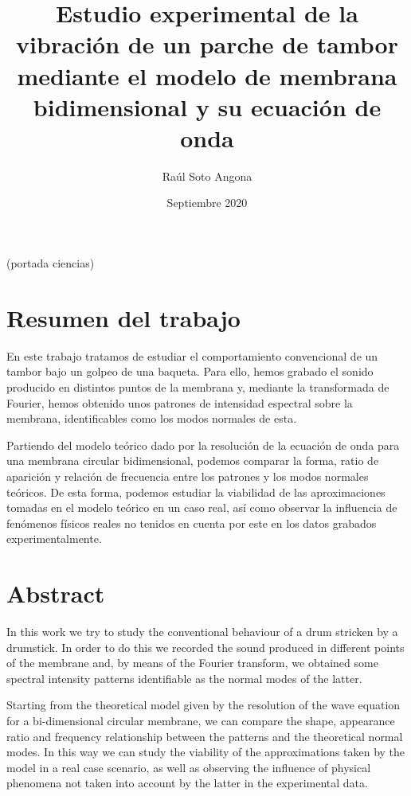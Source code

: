 \documentclass[journal, a4paper,onecolumn]{IEEEtran}
\title{Estudio experimental de la vibración de un parche de tambor mediante el modelo de membrana bidimensional y su ecuación de onda}
\author{Raúl Soto Angona }
\date{Septiembre 2020}
\begin{document}
\maketitle
(portada ciencias)

\newpage

\hspace{0pt}
\vfill
\section*{Resumen del trabajo}

En este trabajo tratamos de estudiar el comportamiento convencional de un tambor bajo un golpeo de una baqueta. Para ello, hemos grabado el sonido producido en distintos puntos de la membrana y, mediante la transformada de Fourier, hemos obtenido unos patrones de intensidad espectral sobre la membrana, identificables como los modos normales de esta.\newline

Partiendo del modelo teórico dado por la resolución de la ecuación de onda para una membrana circular bidimensional, podemos comparar la forma, ratio de aparición y relación de frecuencia entre los patrones y los modos normales teóricos. De esta forma, podemos estudiar la viabilidad de las aproximaciones tomadas en el modelo teórico en un caso real, así como observar la influencia de fenómenos físicos reales no tenidos en cuenta por este en los datos grabados experimentalmente.

\vfill
\hspace{0pt}
\pagebreak

\newpage
\pagebreak
\hspace{0pt}
\vfill
\section*{Abstract}
In this work we try to study the conventional behaviour of a drum stricken by a drumstick. In order to do this we recorded the sound produced in different points of the membrane and, by means of the Fourier transform, we obtained some spectral intensity patterns identifiable as the normal modes of the latter.\newline


Starting from the theoretical model given by the resolution of the wave equation for a bi-dimensional circular membrane, we can compare the shape, appearance ratio and frequency relationship between the patterns and the theoretical normal modes. In this way we can study the viability of the approximations taken by the model in a real case scenario, as well as observing the influence of physical phenomena not taken into account by the latter in the experimental data.
\end{document}
